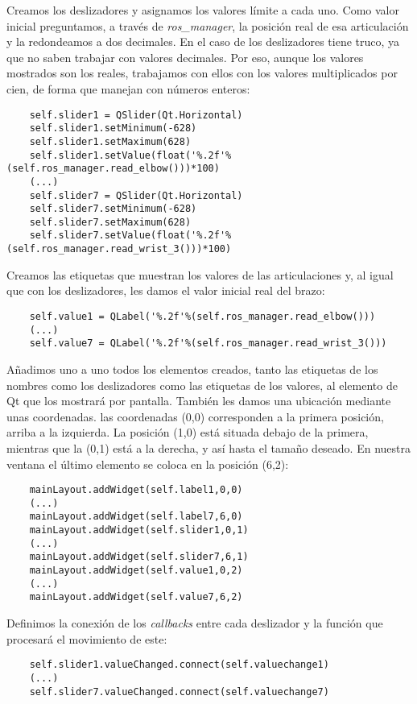 \begin{itemize}
	Creamos los deslizadores y asignamos los valores límite a cada uno. Como valor inicial preguntamos, a través de \textit{ros\_manager}, la posición real de esa articulación y la redondeamos a dos decimales. En el caso de los deslizadores tiene truco, ya que no saben trabajar con valores decimales. Por eso, aunque los valores mostrados son los reales, trabajamos con ellos con los valores multiplicados por cien, de forma que manejan con números enteros:
	\begin{lstlisting}
	self.slider1 = QSlider(Qt.Horizontal)
	self.slider1.setMinimum(-628)
	self.slider1.setMaximum(628)
	self.slider1.setValue(float('%.2f'%(self.ros_manager.read_elbow()))*100)
	(...)
	self.slider7 = QSlider(Qt.Horizontal)
	self.slider7.setMinimum(-628)
	self.slider7.setMaximum(628)
	self.slider7.setValue(float('%.2f'%(self.ros_manager.read_wrist_3()))*100)
	\end{lstlisting}
	
	Creamos las etiquetas que muestran los valores de las articulaciones y, al igual que con los deslizadores, les damos el valor inicial real del brazo:
	\begin{lstlisting}
	self.value1 = QLabel('%.2f'%(self.ros_manager.read_elbow()))
	(...)
	self.value7 = QLabel('%.2f'%(self.ros_manager.read_wrist_3()))
	\end{lstlisting}
	
	Añadimos uno a uno todos los elementos creados, tanto las etiquetas de los nombres como los deslizadores como las etiquetas de los valores, al elemento de Qt que los mostrará por pantalla. También les damos una ubicación mediante unas coordenadas. las coordenadas (0,0) corresponden a la primera posición, arriba a la izquierda. La posición (1,0) está situada debajo de la primera, mientras que la (0,1) está a la derecha, y así hasta el tamaño deseado. En nuestra ventana el último elemento se coloca en la posición (6,2):
	\begin{lstlisting}
	mainLayout.addWidget(self.label1,0,0)
	(...)
	mainLayout.addWidget(self.label7,6,0)
	mainLayout.addWidget(self.slider1,0,1)
	(...)
	mainLayout.addWidget(self.slider7,6,1)
	mainLayout.addWidget(self.value1,0,2)
	(...)
	mainLayout.addWidget(self.value7,6,2)
	\end{lstlisting}
	
	Definimos la conexión de los \textit{callbacks} entre cada deslizador y la función que procesará el movimiento de este:
	\begin{lstlisting}
	self.slider1.valueChanged.connect(self.valuechange1)
	(...)
	self.slider7.valueChanged.connect(self.valuechange7)
	\end{lstlisting}
	

\end{itemize}

